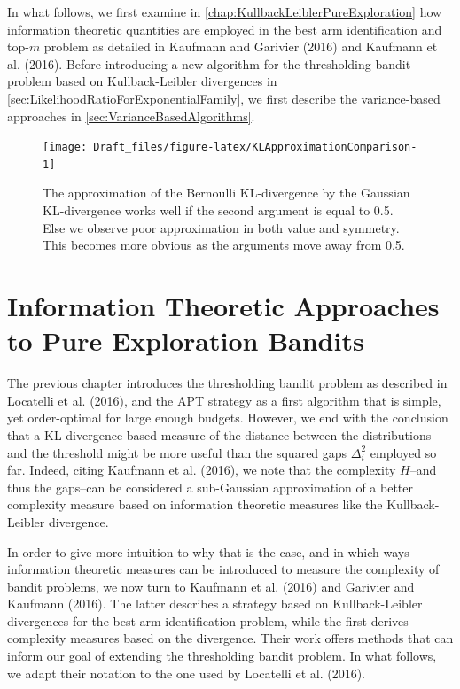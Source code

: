 \documentclass[11pt,]{article}
\begin{document}
In what follows, we first examine in
\autoref{chap:KullbackLeiblerPureExploration} how information theoretic
quantities are employed in the best arm identification and top-\(m\)
problem as detailed in Kaufmann and Garivier (2016) and Kaufmann et al.
(2016). Before introducing a new algorithm for the thresholding bandit
problem based on Kullback-Leibler divergences in
\autoref{sec:LikelihoodRatioForExponentialFamily}, we first describe the
variance-based approaches in \autoref{sec:VarianceBasedAlgorithms}.

\begin{figure}

{\centering \texttt{[image: Draft\_files/figure-latex/KLApproximationComparison-1]} 

}

\caption{The approximation of the Bernoulli KL-divergence by the Gaussian KL-divergence works well if the second argument is equal to 0.5. Else we observe poor approximation in both value and symmetry. This becomes more obvious as the arguments move away from 0.5.}\label{fig:KLApproximationComparison}
\end{figure}

\newpage

\section{\texorpdfstring{Information Theoretic Approaches to Pure
Exploration Bandits
\label{chap:KullbackLeiblerPureExploration}}{Information Theoretic Approaches to Pure Exploration Bandits }}\label{information-theoretic-approaches-to-pure-exploration-bandits}

The previous chapter introduces the thresholding bandit problem as
described in Locatelli et al. (2016), and the APT strategy as a first
algorithm that is simple, yet order-optimal for large enough budgets.
However, we end with the conclusion that a KL-divergence based measure
of the distance between the distributions and the threshold might be
more useful than the squared gaps \(\Delta^2_i\) employed so far.
Indeed, citing Kaufmann et al. (2016), we note that the complexity
\(H\)--and thus the gaps--can be considered a sub-Gaussian approximation
of a better complexity measure based on information theoretic measures
like the Kullback-Leibler divergence.

In order to give more intuition to why that is the case, and in which
ways information theoretic measures can be introduced to measure the
complexity of bandit problems, we now turn to Kaufmann et al. (2016) and
Garivier and Kaufmann (2016). The latter describes a strategy based on
Kullback-Leibler divergences for the best-arm identification problem,
while the first derives complexity measures based on the divergence.
Their work offers methods that can inform our goal of extending the
thresholding bandit problem. In what follows, we adapt their notation to
the one used by Locatelli et al. (2016).
\end{document}
